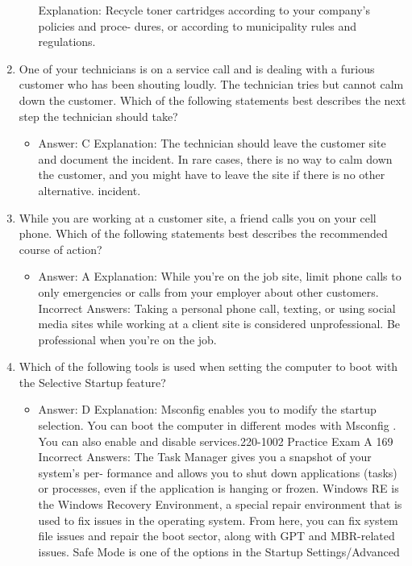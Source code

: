 \documentclass{article}
\begin{document}
\begin{enumerate}
\begin{itemize}
Explanation: Recycle toner cartridges according to your company’s policies and proce-
dures, or according to municipality rules and regulations.
     \end{itemize}
      \item One of your technicians is on a service call and is dealing with a
furious customer who has been shouting loudly. The technician
tries but cannot calm down the customer. Which of the following
statements best describes the next step the technician should
take?
     \begin{itemize}
         \item Answer: C
Explanation: The technician should leave the customer site and document the incident.
In rare cases, there is no way to calm down the customer, and you might have to leave
the site if there is no other alternative.
incident.
     \end{itemize}
      \item While you are working at a customer site, a friend calls you on
your cell phone. Which of the following statements best describes
the recommended course of action?
     \begin{itemize}
         \item Answer: A
Explanation: While you’re on the job site, limit phone calls to only emergencies or calls
from your employer about other customers.
Incorrect Answers: Taking a personal phone call, texting, or using social media sites
while working at a client site is considered unprofessional. Be professional when you’re
on the job.
     \end{itemize}
      \item Which of the following tools is used when setting the computer to
boot with the Selective Startup feature?
     \begin{itemize}
         \item  Answer: D
Explanation: Msconfig enables you to modify the startup selection. You can boot the
computer in different modes with Msconfig . You can also enable and disable services.220-1002 Practice Exam A
169
Incorrect Answers: The Task Manager gives you a snapshot of your system’s per-
formance and allows you to shut down applications (tasks) or processes, even if the
application is hanging or frozen. Windows RE is the Windows Recovery Environment,
a special repair environment that is used to fix issues in the operating system. From
here, you can fix system file issues and repair the boot sector, along with GPT and
MBR-related issues. Safe Mode is one of the options in the Startup Settings/Advanced

\end{itemize}
\end{enumerate}
\end{document}
